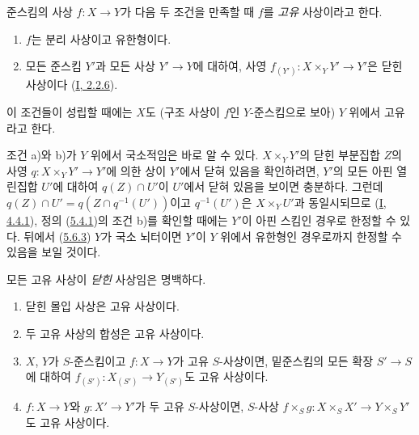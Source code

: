 \begin{definition}[5.4.1]
\label{II.5.4.1-ko}
준스킴의 사상 $f:X\to Y$가 다음 두 조건을 만족할 때 $f$를
\emph{고유} 사상이라고 한다.
\begin{enumerate}
  \item[\rm{a)}] $f$는 분리 사상이고 유한형이다.
  \item[\rm{b)}] 모든 준스킴 $Y'$과 모든 사상 $Y'\to Y$에 대하여,
  사영 $f_{(Y')}:X\times_YY'\to Y'$은 닫힌 사상이다
  (\hyperref[I.2.2.6-ko]{I, 2.2.6}).
\end{enumerate}
이 조건들이 성립할 때에는 $X$도 (구조 사상이 $f$인 $Y$-준스킴으로
보아) $Y$ 위에서 고유라고 한다.
\end{definition}

조건 a)와 b)가 $Y$ 위에서 국소적임은 바로 알 수 있다. $X\times_YY'$의
닫힌 부분집합 $Z$의 사영
$q:X\times_YY'\to Y'$에 의한 상이 $Y'$에서 닫혀 있음을 확인하려면,
$Y'$의 모든 아핀 열린집합 $U'$에 대하여 $q(Z)\cap U'$이 $U'$에서 닫혀
있음을 보이면 충분하다. 그런데
$q(Z)\cap U'=q(Z\cap q^{-1}(U'))$이고 $q^{-1}(U')$은
$X\times_YU'$과 동일시되므로
(\hyperref[I.4.4.1-ko]{I, 4.4.1}), 정의
(\hyperref[II.5.4.1-ko]{5.4.1})의 조건 b)를 확인할 때에는 $Y'$이 아핀
스킴인 경우로 한정할 수 있다. 뒤에서
(\hyperref[II.5.6.3-ko]{5.6.3}) $Y$가 국소 뇌터이면 $Y'$이 $Y$ 위에서
유한형인 경우로까지 한정할 수 있음을 보일 것이다.

모든 고유 사상이 \emph{닫힌} 사상임은 명백하다.

\begin{proposition}[5.4.2]
\label{II.5.4.2-ko}
\begin{enumerate}
  \item[\rm{(i)}] 닫힌 몰입 사상은 고유 사상이다.
  \item[\rm{(ii)}] 두 고유 사상의 합성은 고유 사상이다.
  \item[\rm{(iii)}] $X$, $Y$가 $S$-준스킴이고
  $f:X\to Y$가 고유 $S$-사상이면, 밑준스킴의 모든 확장
  $S'\to S$에 대하여 $f_{(S')}:X_{(S')}\to Y_{(S')}$도 고유 사상이다.
  \item[\rm{(iv)}] $f:X\to Y$와 $g:X'\to Y'$가 두 고유 $S$-사상이면,
  $S$-사상
  $f\times_Sg:X\times_SX'\to Y\times_SY'$도 고유 사상이다.
\end{enumerate}
\end{proposition}


